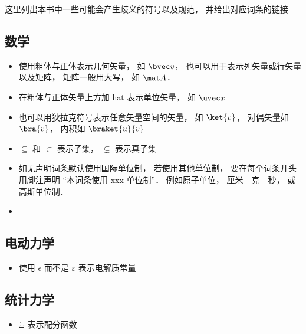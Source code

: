 
这里列出本书中一些可能会产生歧义的符号以及规范， 并给出对应词条的链接

\subsection{数学}
\begin{itemize}
\item 使用粗体与正体表示几何矢量， 如 $\bvec v$， 也可以用于表示列矢量或行矢量以及矩阵， 矩阵一般用大写， 如 $\mat A$．
\item 在粗体与正体矢量上方加 hat 表示单位矢量， 如 $\uvec x$
\item 也可以用狄拉克符号表示任意矢量空间的矢量， 如 $\ket{v}$， 对偶矢量如 $\bra{v}$， 内积如 $\braket{u}{v}$
\item $\subseteq$ 和 $\subset$ 表示子集， $\subsetneq$ 表示真子集
\item 如无声明词条默认使用国际单位制， 若使用其他单位制， 要在每个词条开头用脚注声明 “本词条使用 xxx 单位制”． 例如原子单位， 厘米—克—秒， 或高斯单位制．
\item 
\end{itemize}

\subsection{电动力学}
\begin{itemize}
\item 使用 $\epsilon$ 而不是 $\varepsilon$ 表示电解质常量
\end{itemize}

\subsection{统计力学}
\begin{itemize}
\item $\Xi$ 表示配分函数
\end{itemize}
